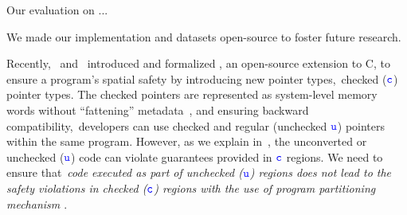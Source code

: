 Our evaluation on ...

We made our implementation and datasets open-source to foster future research. 

\iffalse
 
% 
Recently,~\citet{Elliott2018} and~\citet{li22checkedc} introduced and formalized \checkedc, an
open-source extension to C,
to ensure a program’s spatial safety by introducing new pointer types,~\ie checked ($\textcolor{blue}{\texttt{c}}$) pointer types.
%
The checked pointers are represented as system-level memory words without ``fattening'' metadata~\cite{duck2016heap}, 
and ensuring backward compatibility,~\ie developers can use checked and regular (unchecked $\textcolor{blue}{\texttt{u}}$) pointers within the same program.
However, as we explain in~, the
unconverted or unchecked ($\textcolor{blue}{\texttt{u}}$) code can violate guarantees provided in $\textcolor{blue}{\texttt{c}}$
regions.
%
We need to ensure that~\emph{code executed as part of 
unchecked ($\textcolor{blue}{\texttt{u}}$) regions does not lead to the safety violations in checked ($\textcolor{blue}{\texttt{c}}$) regions  with the use of program partitioning mechanism \cite{rul2009towards}}.

